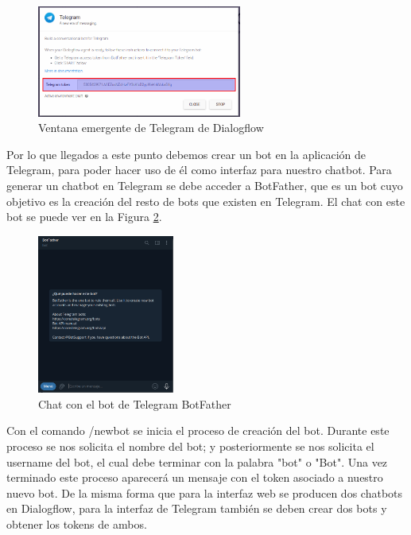 \begin{figure}[h]
\centering
\includegraphics[width=0.6\textwidth]{imagenes/07_Implementacion/token_telegram.png}
\caption{Ventana emergente de Telegram de Dialogflow}
\label{fig:token_telegram}
\end{figure}

Por lo que llegados a este punto debemos crear un bot en la aplicación de Telegram, para poder hacer uso de él como interfaz para nuestro chatbot. Para generar un chatbot en Telegram se debe acceder a BotFather, que es un bot cuyo objetivo es la creación del resto de bots que existen en Telegram. El chat con este bot se puede ver en la Figura \ref{fig:bot_father}.

\begin{figure}[h]
\centering
\includegraphics[width=0.4\textwidth]{imagenes/07_Implementacion/bot_father.png}
\caption{Chat con el bot de Telegram BotFather}
\label{fig:bot_father}
\end{figure}

Con el comando /newbot se inicia el proceso de creación del bot. Durante este proceso se nos solicita el nombre del bot; y posteriormente se nos solicita el username del bot, el cual debe terminar con la palabra "bot" o "Bot". Una vez terminado este proceso aparecerá un mensaje con el token asociado a nuestro nuevo bot. De la misma forma que para la interfaz web se producen dos chatbots en Dialogflow, para la interfaz de Telegram también se deben crear dos bots y obtener los tokens de ambos.

